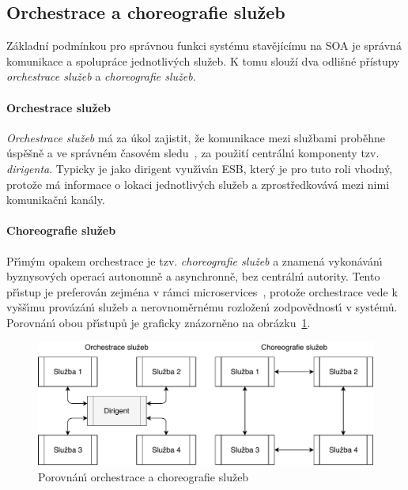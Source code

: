 \subsection{Orchestrace a choreografie služeb}

Základní podmínkou pro správnou funkci systému stavějícímu na \gls{SOA} je správná
komunikace a spolupráce jednotlivých služeb. K tomu slouží dva odlišné přístupy \textendash\xspace
\textit{orchestrace služeb} a \textit{choreografie služeb}.

\paragraph{Orchestrace služeb}
\textit{Orchestrace služeb} má za úkol zajistit, že komunikace mezi službami
proběhne úspěšně a ve správném časovém sledu~\cite{orchestration},
za použití centráln\'{\i} komponenty \textendash\xspace tzv. \textit{dirigenta}.
Typicky je jako dirigent využ\'{\i}ván \gls{ESB}, kter\'y je pro tuto roli vhodn\'y,
protože má informace o lokaci jednotliv\'ych služeb a zprostředkovává mezi nimi
komunikačn\'{\i} kanály.

\paragraph{Choreografie služeb}
Př\'{\i}m\'ym opakem orchestrace je tzv. \textit{choreografie služeb} a znamená
vykonáván\'{\i} byznysov\'ych operac\'{\i} autonomně a asynchronně, bez centráln\'{\i}
autority. Tento př\'{\i}stup je preferován zejména v rámci microservices~\cite{dragoni2017microservices},
protože orchestrace vede k vyšš\'{\i}mu provázán\'{\i} služeb a nerovnoměrnému rozložen\'{\i}
zodpovědnost\'{\i} v systémů. Porovnán\'{\i} obou př\'{\i}stupů je graficky
znázorněno na obrázku~\ref{fig:choreography-orchestration}.

\begin{figure}
    \centering
    \includegraphics[keepaspectratio=true, width=0.8\linewidth]{figures/choreography-orchestration.pdf}
    \caption{Porovnán\'{\i} orchestrace a choreografie služeb~\cite{cerny2017disambiguation}}
    \label{fig:choreography-orchestration}
\end{figure}

